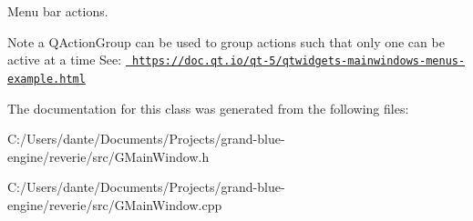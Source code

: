 Menu bar actions. 

\begin{DoxyNote}{Note}
a Q\+Action\+Group can be used to group actions such that only one can be active at a time See\+: \href{https://doc.qt.io/qt-5/qtwidgets-mainwindows-menus-example.html}{\texttt{ https\+://doc.\+qt.\+io/qt-\/5/qtwidgets-\/mainwindows-\/menus-\/example.\+html}} 
\end{DoxyNote}


The documentation for this class was generated from the following files\+:\begin{DoxyCompactItemize}
\item 
C\+:/\+Users/dante/\+Documents/\+Projects/grand-\/blue-\/engine/reverie/src/G\+Main\+Window.\+h\item 
C\+:/\+Users/dante/\+Documents/\+Projects/grand-\/blue-\/engine/reverie/src/G\+Main\+Window.\+cpp\end{DoxyCompactItemize}
